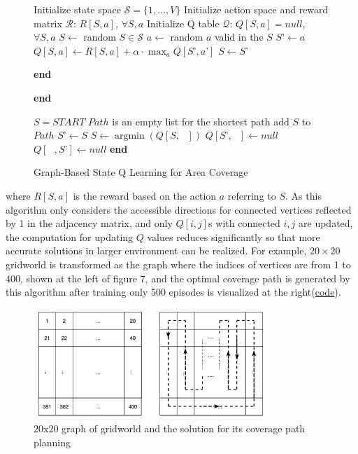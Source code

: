 \documentclass{article}
\DeclareMathOperator*{\argmin}{argmin}
\begin{document}
\begin{figure}[H]
  \centering
  \begin{minipage}{.7\linewidth}
  
\begin{algorithm}[H]
\caption{Graph-Based State Q Learning for Area Coverage} 

\begin{algorithmic}[1]
    \State Initialize state space $\mathcal{S} = \{1, \dots, V\}$
    \State Initialize action space and reward matrix $\mathcal{R}$: $R[S, a]$, $\forall S, a$
    \State Initialize Q table $\mathcal{Q}$: $Q[S, a] =  null$,  $\forall S, a$ 
        \State $S  \gets$ random $S \in \mathcal{S}$
        \State $a \gets$ random $a$ valid in the $S$
		\State $S’ \gets a$
		\State $Q[S, a] \gets R[S,a] + \alpha \cdot \max_a Q[S’, a’]$
		\State $S \gets S’$
        \EndWhile
        
\State \textbf{end}
    \EndWhile
    
\State \textbf{end}

\State $S = START$   
\State $Path$ is an empty list for the shortest path
    \State add $S$ to $Path$
	\State $S’ \gets S$
	\State $S \gets \argmin (Q[S, \text{ }])$
	\State $Q[S’,\text{  }] \gets null$
	\State $Q[\text{     }, S’] \gets null$
\EndWhile
\State \textbf{end}
\end{algorithmic}
\end{algorithm}

  \end{minipage}
\end{figure}

\noindent where $R[S,a]$ is the reward based on the action $a$ referring to $S$. As this algorithm only considers the accessible directions for connected vertices reflected by 1 in the adjacency matrix, and only $Q[i,j]$s with connected $i,j$ are updated, the computation for updating $Q$ values reduces significantly so that more accurate solutions in larger environment can be realized. For example, $20\times 20$ gridworld is transformed as the graph where the indices of vertices are from 1 to 400, shown at the left of figure 7, and the optimal coverage path is generated by this algorithm after training only 500 episodes is visualized at the right(\href{https://github.com/zcczhang/UAV_Coverage/tree/master/Graph_Based_Coverage}{code}).

\begin{figure}[H]
     \centering
     \includegraphics[width=3.5in]{8.png}
     \caption{20x20 graph of gridworld and the solution for its coverage path planning}
\end{figure}
\end{document}
